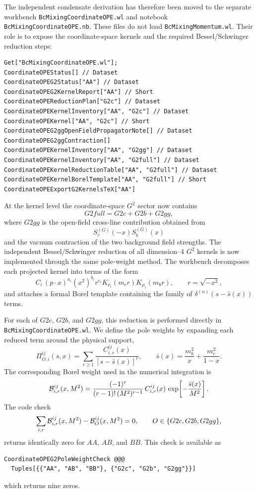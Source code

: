 \documentclass[11pt]{article}
\begin{document}
The independent condensate derivation has therefore been moved to the separate
workbench \texttt{BcMixingCoordinateOPE.wl} and notebook
\texttt{BcMixingCoordinateOPE.nb}.  These files do not load
\texttt{BcMixingMomentum.wl}.  Their role is to expose the coordinate-space
kernels and the required Bessel/Schwinger reduction steps:
\begin{verbatim}
Get["BcMixingCoordinateOPE.wl"];
CoordinateOPEStatus[] // Dataset
CoordinateOPEG2Status["AA"] // Dataset
CoordinateOPEG2KernelReport["AA"] // Short
CoordinateOPEReductionPlan["G2c"] // Dataset
CoordinateOPEKernelInventory["AA", "G2c"] // Dataset
CoordinateOPEKernel["AA", "G2c"] // Short
CoordinateOPEG2ggOpenFieldPropagatorNote[] // Dataset
CoordinateOPEG2ggContraction[]
CoordinateOPEKernelInventory["AA", "G2gg"] // Dataset
CoordinateOPEKernelInventory["AA", "G2full"] // Dataset
CoordinateOPEKernelReductionTable["AA", "G2full"] // Dataset
CoordinateOPEKernelBorelTemplate["AA", "G2full"] // Short
CoordinateOPEExportG2KernelsTeX["AA"]
\end{verbatim}
At the kernel level the coordinate-space \(G^2\) sector now contains
\[
  G2full=G2c+G2b+G2gg ,
\]
where \(G2gg\) is the open-field cross-line contribution obtained from
\[
  S_c^{(G)}(-x)S_b^{(G)}(x)
\]
and the vacuum contraction of the two background field strengths.  The
independent Bessel/Schwinger reduction of all dimension--4 \(G^2\) kernels is
now implemented through the same pole-weight method.  The workbench decomposes
each projected kernel into
terms of the form
\[
  C_i\,(p\cdot x)^{a_i}(x^2)^{b_i}r^{c_i}
  K_{\nu_i}(m_c r)K_{\mu_i}(m_b r),
  \qquad r=\sqrt{-x^2},
\]
and attaches a formal Borel template containing the family of
\(\delta^{(n)}(s-\bar s(x))\) terms.

For each of \(G2c\), \(G2b\), and \(G2gg\), this reduction is performed
directly in \texttt{BcMixingCoordinateOPE.wl}.  We define the pole weights by
expanding each reduced term around the physical support,
\[
  \Pi^{ij}_{O,i}(s,x)
  =
  \sum_{r\geq 1}
  \frac{C^{ij}_{i,r}(x)}
       {\left[s-\bar s(x)\right]^r},
  \qquad
  \bar s(x)=\frac{m_b^2}{x}+\frac{m_c^2}{1-x}.
\]
The corresponding Borel weight used in the numerical integration is
\[
  {\cal B}^{ij}_{i,r}(x,M^2)
  =
  \frac{(-1)^r}{(r-1)!\,(M^2)^{r-1}}\,
  C^{ij}_{i,r}(x)\,
  \exp\!\left[-\frac{\bar s(x)}{M^2}\right].
\]
The code check
\[
  \sum_{i,r}{\cal B}^{ij}_{i,r}(x,M^2)
  -
  {\cal B}^{ij}_{O}(x,M^2)=0,
  \qquad O\in\{G2c,G2b,G2gg\},
\]
returns identically zero for \(AA\), \(AB\), and \(BB\).  This check is
available as
\begin{verbatim}
CoordinateOPEG2PoleWeightCheck @@@
  Tuples[{{"AA", "AB", "BB"}, {"G2c", "G2b", "G2gg"}}]
\end{verbatim}
which returns nine zeros.
\end{document}
